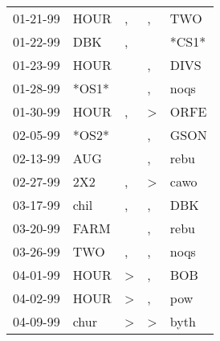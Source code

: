 \begin{supertabular}{p{0.07\textwidth}p{0.06\textwidth}p{0.02\textwidth}p{0.02\textwidth}p{0.06\textwidth}}
          01-21-99\textsuperscript{} &           HOUR\textsuperscript{} &                , &                , &            TWO\textsuperscript{} \\
          01-22-99\textsuperscript{} &            DBK\textsuperscript{} &                , &                  &                            *CS1* \\
          01-23-99\textsuperscript{} &           HOUR\textsuperscript{} &                  &                , &           DIVS\textsuperscript{} \\
          01-28-99\textsuperscript{} &                            *OS1* &                  &                , &           noqs\textsuperscript{} \\
          01-30-99\textsuperscript{} &           HOUR\textsuperscript{} &                , &     \textgreater &           ORFE\textsuperscript{} \\
          02-05-99\textsuperscript{} &                            *OS2* &                  &                , &           GSON\textsuperscript{} \\
          02-13-99\textsuperscript{} &            AUG\textsuperscript{} &                  &                , &           rebu\textsuperscript{} \\
          02-27-99\textsuperscript{} &            2X2\textsuperscript{} &                , &     \textgreater &           cawo\textsuperscript{} \\
          03-17-99\textsuperscript{} &           chil\textsuperscript{} &                , &                , &            DBK\textsuperscript{} \\
          03-20-99\textsuperscript{} &           FARM\textsuperscript{} &                  &                , &           rebu\textsuperscript{} \\
          03-26-99\textsuperscript{} &            TWO\textsuperscript{} &                , &                , &           noqs\textsuperscript{} \\
          04-01-99\textsuperscript{} &           HOUR\textsuperscript{} &     \textgreater &                , &            BOB\textsuperscript{} \\
          04-02-99\textsuperscript{} &           HOUR\textsuperscript{} &     \textgreater &                , &            pow\textsuperscript{} \\
          04-09-99\textsuperscript{} &           chur\textsuperscript{} &     \textgreater &     \textgreater &           byth\textsuperscript{} \\

\end{supertabular}
